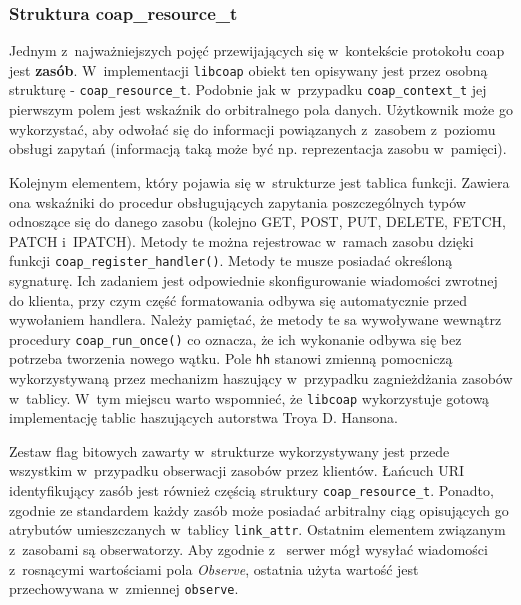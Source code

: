 
\subsubsection{Struktura coap\_resource\_t}

Jednym z~najważniejszych pojęć przewijających się w~kontekście protokołu coap jest \textbf{zasób}. W~implementacji \verb|libcoap| obiekt ten opisywany jest przez osobną strukturę - \verb|coap_resource_t|. Podobnie jak w~przypadku \verb|coap_context_t| jej pierwszym polem jest wskaźnik do orbitralnego pola danych. Użytkownik może go wykorzystać, aby odwołać się do informacji powiązanych z~zasobem z~poziomu obsługi zapytań (informacją taką może być np. reprezentacja zasobu w~pamięci).

Kolejnym elementem, który pojawia się w~strukturze jest tablica funkcji. Zawiera ona wskaźniki do procedur obsługujących zapytania poszczególnych typów odnoszące się do danego zasobu (kolejno GET, POST, PUT, DELETE, FETCH, PATCH i~IPATCH). Metody te można rejestrowac w~ramach zasobu dzięki funkcji \verb|coap_register_handler()|. Metody te musze posiadać określoną sygnaturę. Ich zadaniem jest odpowiednie skonfigurowanie wiadomości zwrotnej do klienta, przy czym część formatowania odbywa się automatycznie przed wywołaniem handlera. Należy pamiętać, że metody te sa wywoływane wewnątrz procedury \verb|coap_run_once()| co oznacza, że ich wykonanie odbywa się bez potrzeba tworzenia nowego wątku. Pole \verb|hh| stanowi zmienną pomocniczą wykorzystywaną przez mechanizm haszujący w~przypadku zagnieżdżania zasobów w~tablicy. W~tym miejscu warto wspomnieć, że \verb|libcoap| wykorzystuje gotową implementację tablic haszujących autorstwa Troya D. Hansona.

\vspace{0.5cm}

\vspace{0.5cm}

Zestaw flag bitowych zawarty w~strukturze wykorzystywany jest przede wszystkim w~przypadku obserwacji zasobów przez klientów. Łańcuch URI identyfikujący zasób jest również częścią struktury \verb|coap_resource_t|. Ponadto, zgodnie ze standardem każdy zasób może posiadać arbitralny ciąg opisujących go atrybutów umieszczanych w~tablicy \verb|link_attr|. Ostatnim elementem związanym z~zasobami są obserwatorzy. Aby zgodnie z~\cite{rfc_observer} serwer mógł wysyłać wiadomości z~rosnącymi wartościami pola \textit{Observe}, ostatnia użyta wartość jest przechowywana w~zmiennej \verb|observe|.


